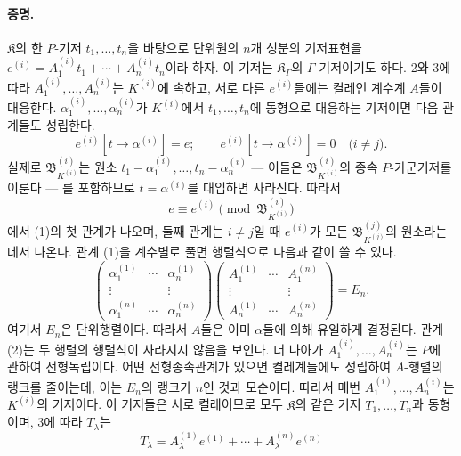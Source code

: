 \paragraph{증명.}
\(\mathfrak K\)의 한 \(P\)-기저 \(t_1,\ldots,t_n\)을 바탕으로 단위원의 \(n\)개 성분의 기저표현을 \(e^{(i)}=A_1^{(i)}t_1+\cdots+A_n^{(i)}t_n\)이라 하자. 이 기저는 \(\mathfrak K_\Gamma\)의 \(\Gamma\)-기저이기도 하다. 2와 3에 따라 \(A_1^{(i)},\ldots,A_n^{(i)}\)는 \(K^{(i)}\)에 속하고, 서로 다른 \(e^{(i)}\)들에는 켤레인 계수계 \(A\)들이 대응한다. \(\alpha_1^{(i)},\ldots,\alpha_n^{(i)}\)가 \(K^{(i)}\)에서 \(t_1,\ldots,t_n\)에 동형으로 대응하는 기저이면 다음 관계들도 성립한다.
\begin{equation}
e^{(i)}[t\to\alpha^{(i)}]=e;
\qquad e^{(i)}[t\to\alpha^{(j)}]=0\quad\text{(\(i\ne j\)).} \tag{1}
\end{equation}
실제로 \(\mathfrak B_{K^{(i)}}^{(i)}\)는 원소 \(t_1-\alpha_1^{(i)},\ldots,t_n-\alpha_n^{(i)}\) --- 이들은 \(\mathfrak B_{K^{(i)}}^{(i)}\)의 종속 \(P\)-가군기저를 이룬다 --- 를 포함하므로 \(t=\alpha^{(i)}\)를 대입하면 사라진다. 따라서
\[
e\equiv e^{(i)}\pmod{\mathfrak B_{K^{(i)}}^{(i)}}
\]
에서 (1)의 첫 관계가 나오며, 둘째 관계는 \(i\ne j\)일 때 \(e^{(i)}\)가 모든 \(\mathfrak B_{K^{(j)}}^{(j)}\)의 원소라는 데서 나온다. 관계 (1)을 계수별로 풀면 행렬식으로 다음과 같이 쓸 수 있다.
\begin{equation}
\begin{pmatrix}
\alpha_1^{(1)}&\cdots&\alpha_n^{(1)}\\
\vdots&&\vdots\\
\alpha_1^{(n)}&\cdots&\alpha_n^{(n)}
\end{pmatrix}
\begin{pmatrix}
A_1^{(1)}&\cdots&A_1^{(n)}\\
\vdots&&\vdots\\
A_n^{(1)}&\cdots&A_n^{(n)}
\end{pmatrix}=E_n. \tag{2}
\end{equation}
여기서 \(E_n\)은 단위행렬이다. 따라서 \(A\)들은 이미 \(\alpha\)들에 의해 유일하게 결정된다. 관계 (2)는 두 행렬의 행렬식이 사라지지 않음을 보인다. 더 나아가 \(A_1^{(i)},\ldots,A_n^{(i)}\)는 \(P\)에 관하여 선형독립이다. 어떤 선형종속관계가 있으면 켤레계들에도 성립하여 \(A\)-행렬의 랭크를 줄이는데, 이는 \(E_n\)의 랭크가 \(n\)인 것과 모순이다. 따라서 매번 \(A_1^{(i)},\ldots,A_n^{(i)}\)는 \(K^{(i)}\)의 기저이다. 이 기저들은 서로 켤레이므로 모두 \(\mathfrak K\)의 같은 기저 \(T_1,\ldots,T_n\)과 동형이며, 3에 따라 \(T_\lambda\)는
\[
T_\lambda=A_\lambda^{(1)}e^{(1)}+\cdots+A_\lambda^{(n)}e^{(n)}
\]
